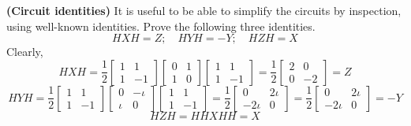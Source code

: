 \begin{example}
    \textbf{(Circuit identities)} It is useful to be able to simplify the circuits by inspection, using well-known identities. Prove the following three identities.
    \[
    HXH=Z;\quad HYH=-Y;\quad HZH=X
    \]
    Clearly, 
    \[
    HXH=\frac{1}{2}\begin{bmatrix}1 & 1 \\ 1 & -1 \end{bmatrix}\begin{bmatrix} 0 & 1 \\ 1 & 0 \end{bmatrix}\begin{bmatrix} 1 & 1 \\ 1 & -1 \end{bmatrix} =\frac{1}{2}\begin{bmatrix}2 & 0 \\ 0 & -2 \end{bmatrix} = Z
    \]
    \[
    HYH=\frac{1}{2}\begin{bmatrix} 1 & 1 \\ 1 & -1 \end{bmatrix} \begin{bmatrix} 0 & -\iota \\ \iota & 0 \end{bmatrix} \begin{bmatrix} 1 & 1 \\ 1 & -1 \end{bmatrix} =\frac{1}{2} \begin{bmatrix} 0 & 2\iota \\ -2\iota & 0 \end{bmatrix} =\frac{1}{2}\begin{bmatrix} 0 & 2 \iota \\ -2\iota & 0 \end{bmatrix} = -Y
    \]
    \[
    HZH=HHXHH=X
    \]
\end{example}
